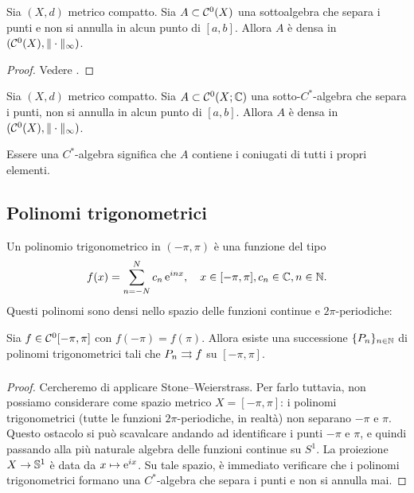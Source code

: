 \begin{theorem}
	Sia $(X,d)$ metrico compatto. Sia $A \subset \Czero(X)$ una sottoalgebra che separa i punti e non si annulla in alcun punto di $[a,b]$.
	Allora $A$ è densa in $(\Czero(X), \|\cdot\|_\infty)$.
\end{theorem}
\begin{proof}
	Vedere \cite{rudin1991functional}.
\end{proof}

\begin{theorem}
	Sia $(X,d)$ metrico compatto. Sia $A \subset \Czero(X; \C)$ una sotto-$C^*$-algebra che separa i punti, non si annulla in alcun punto di $[a,b]$.
	Allora $A$ è densa in $(\Czero(X), \|\cdot\|_\infty)$.
\end{theorem}

\begin{remark}
	Essere una $C^*$-algebra significa che $A$ contiene i coniugati di tutti i propri elementi.
\end{remark}

\subsection{Polinomi trigonometrici}
Un polinomio trigonometrico in $(-\pi,\pi)$ è una funzione del tipo
\begin{equation*}
	f(x) = \sum_{n=-N}^N c_n\,\e^{inx}, \quad x \in [-\pi,\pi], c_n \in \C, n \in \N.
\end{equation*}
Questi polinomi sono densi nello spazio delle funzioni continue e $2\pi$-periodiche:

\begin{lemma}
	Sia $f \in \Czero[-\pi,\pi]$ con $f(-\pi) = f(\pi)$.
	Allora esiste una successione $\{P_n\}_{n \in \N}$ di polinomi trigonometrici tali che $P_n \uniconv[] f$ su $[-\pi,\pi]$.
\end{lemma}
\begin{proof}
	Cercheremo di applicare Stone--Weierstrass.
	Per farlo tuttavia, non possiamo considerare come spazio metrico $X = [-\pi,\pi]$: i polinomi trigonometrici (tutte le funzioni $2\pi$-periodiche, in realtà) non separano $-\pi$ e $\pi$.
	Questo ostacolo si può scavalcare andando ad identificare i punti $-\pi$ e $\pi$, e quindi passando alla più naturale algebra delle funzioni continue su $S^1$. La proiezione $X \to \S^1$ è data da $x \mapsto \e^{ix}$.
	Su tale spazio, è immediato verificare che i polinomi trigonometrici formano una $C^*$-algebra che separa i punti e non si annulla mai.
\end{proof}

